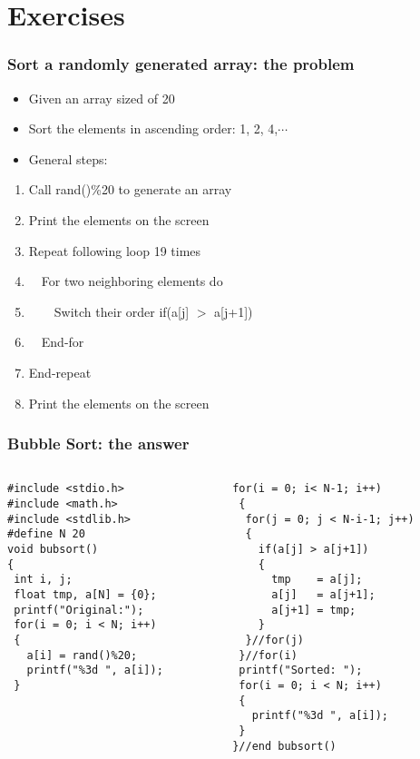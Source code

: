 \section{Exercises}
\label{sec:exec}

\ifx\extra\undefined
\begin{frame}
\frametitle{Sort a randomly generated array: the problem}
\begin{itemize}
	\item {Given an array sized of 20}
	\item {Sort the elements in ascending order: 1, 2, 4,$\cdots$}
	\item {General steps:}
\end{itemize}
\begin{enumerate}
	\item {Call rand()\%20 to generate an array}
	\item {Print the elements on the screen}
	\item {Repeat following loop 19 times}
	\item {~~For two neighboring elements do}
	\item {~~~~Switch their order if(a[j] $>$ a[j+1])}
	\item {~~End-for}
	\item {End-repeat}
	\item {Print the elements on the screen}
\end{enumerate}
\end{frame}

\ifx\answer\undefined
\begin{frame}[fragile]
\frametitle{Bubble Sort: the answer}
\vspace{-0.25in}
\begin{columns}
\begin{column}{0.53\linewidth}
\begin{lstlisting}[linewidth=0.95\linewidth, xleftmargin=0.05\linewidth]
#include <stdio.h>
#include <math.h>
#include <stdlib.h>
#define N 20
void bubsort()
{
 int i, j;
 float tmp, a[N] = {0};
 printf("Original:");
 for(i = 0; i < N; i++)
 {
   a[i] = rand()%20;
   printf("%3d ", a[i]);
 }
\end{lstlisting}
\end{column}
\begin{column}{0.47\linewidth}
\begin{lstlisting}[firstnumber=15]
 for(i = 0; i< N-1; i++)
 {
  for(j = 0; j < N-i-1; j++)
  {
    if(a[j] > a[j+1])
    {
      tmp    = a[j];
      a[j]   = a[j+1];
      a[j+1] = tmp;
    }
  }//for(j)
 }//for(i)
 printf("Sorted: ");
 for(i = 0; i < N; i++)
 {
   printf("%3d ", a[i]);
 }
}//end bubsort()
\end{lstlisting}
\end{column}
\end{columns}

\end{frame}
\fi
\fi

